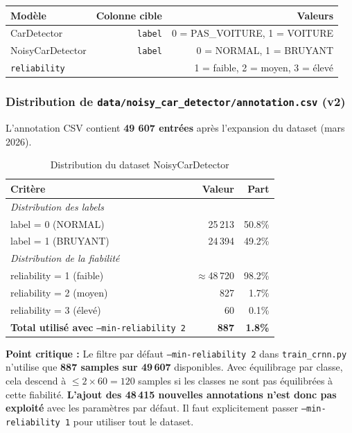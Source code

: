 \documentclass[11pt,a4paper]{article}
\newcommand{\file}[1]{\texttt{\small #1}}
\newcommand{\param}[1]{\texttt{#1}}
\begin{document}
\begin{table}[h!]
\centering
\renewcommand{\arraystretch}{1.3}
\begin{tabular}{lrr}
\toprule
\textbf{Modèle} & \textbf{Colonne cible} & \textbf{Valeurs} \\
\midrule
CarDetector   & \param{label}       & 0 = PAS\_VOITURE, 1 = VOITURE \\
NoisyCarDetector & \param{label}   & 0 = NORMAL, 1 = BRUYANT \\
\multicolumn{2}{l}{\param{reliability}} & 1 = faible, 2 = moyen, 3 = élevé \\
\bottomrule
\end{tabular}
\end{table}

\subsubsection{Distribution de \file{data/noisy\_car\_detector/annotation.csv} (v2)}

L'annotation CSV contient \textbf{49 607 entrées} après l'expansion du dataset (mars 2026).

\begin{table}[h!]
\centering
\renewcommand{\arraystretch}{1.3}
\begin{tabular}{lrr}
\toprule
\textbf{Critère} & \textbf{Valeur} & \textbf{Part} \\
\midrule
\multicolumn{3}{l}{\textit{Distribution des labels}} \\
\quad label = 0 (NORMAL)  & 25\,213 & 50.8\% \\
\quad label = 1 (BRUYANT) & 24\,394 & 49.2\% \\
\midrule
\multicolumn{3}{l}{\textit{Distribution de la fiabilité}} \\
\quad reliability = 1 (faible) & $\approx$48\,720 & 98.2\% \\
\quad reliability = 2 (moyen)  & 827              & 1.7\% \\
\quad reliability = 3 (élevé)  & 60               & 0.1\% \\
\midrule
\textbf{Total utilisé avec} \param{--min-reliability 2} & \textbf{887} & \textbf{1.8\%} \\
\bottomrule
\end{tabular}
\caption{Distribution du dataset NoisyCarDetector}
\end{table}

\begin{dangerbox}
\textbf{Point critique :} Le filtre par défaut \param{--min-reliability 2} dans \file{train\_crnn.py}
n'utilise que \textbf{887 samples sur 49\,607} disponibles. Avec équilibrage par classe, cela
descend à $\leq 2 \times 60 = 120$ samples si les classes ne sont pas équilibrées à cette fiabilité.
\textbf{L'ajout des 48\,415 nouvelles annotations n'est donc pas exploité} avec les paramètres par défaut.
Il faut explicitement passer \param{--min-reliability 1} pour utiliser tout le dataset.
\end{dangerbox}
\end{document}

